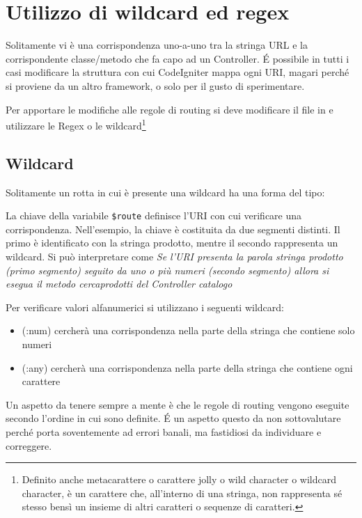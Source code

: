 \section{Utilizzo di wildcard ed regex}
Solitamente vi è una corrispondenza uno-a-uno tra la stringa \ac{URL} e la corrispondente classe/metodo che fa capo ad un Controller. \'E possibile in tutti i casi modificare la struttura con cui CodeIgniter mappa ogni \ac{URI}, magari perché si proviene da un altro framework, o solo per il gusto di sperimentare. 

Per apportare le modifiche alle regole di routing si deve modificare il file  in  e utilizzare le Regex o le wildcard\footnote{Definito anche metacarattere o carattere jolly o wild character o wildcard character, è un carattere che, all'interno di una stringa, non rappresenta sé stesso bensì un insieme di altri caratteri o sequenze di caratteri.}

\subsection{Wildcard}
Solitamente un rotta in cui è presente una wildcard ha una forma del tipo:


La chiave della variabile \verb|$route| definisce l'\ac{URI} con cui verificare una corrispondenza. Nell'esempio, la chiave è costituita da due segmenti distinti. Il primo è identificato con la stringa prodotto, mentre il secondo rappresenta un wildcard. Si può interpretare come \emph{Se l'URI presenta la parola stringa prodotto (primo segmento) seguito da uno o più numeri (secondo segmento) allora si esegua il metodo cercaprodotti del Controller catalogo}

Per verificare valori alfanumerici si utilizzano i seguenti wildcard:

\begin{itemize}
\item (:num) cercherà una corrispondenza nella parte della stringa che contiene solo numeri

\item (:any) cercherà una corrispondenza nella parte della stringa che contiene ogni carattere
\end{itemize}

Un aspetto da tenere sempre a mente è che le regole di routing vengono eseguite secondo l'ordine in cui sono definite. \'E un aspetto questo da non sottovalutare perché porta soventemente ad errori banali, ma fastidiosi da individuare e correggere. 

